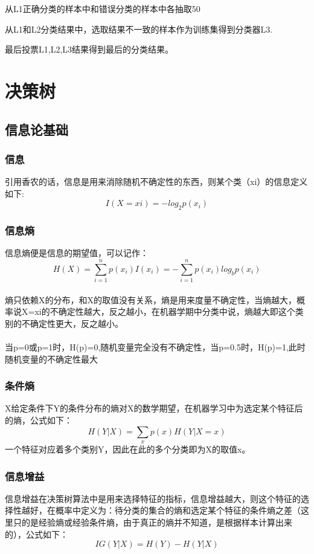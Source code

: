 \documentclass[18pt,a4paper,oneside,UTF8]{ctexart}
\begin{document}
从L1正确分类的样本中和错误分类的样本中各抽取50%

从L1和L2分类结果中，选取结果不一致的样本作为训练集得到分类器L3.

最后投票L1,L2,L3结果得到最后的分类结果。
\section{决策树}
\subsection{信息论基础}
\subsubsection{信息}
引用香农的话，信息是用来消除随机不确定性的东西，则某个类（xi）的信息定义如下:\newline
\[
    I(X=xi)=-log_2p(x_i)  
\]
\subsubsection{信息熵}
信息熵便是信息的期望值，可以记作：\newline
\[
    H(X)=\sum_{i=1}^np(x_i)I(x_i)=-\sum_{i=1}^np(x_i)log_bp(x_i)
\]
\paragraph{}
熵只依赖X的分布，和X的取值没有关系，熵是用来度量不确定性，当熵越大，概率说X=xi的不确定性越大，反之越小，在机器学期中分类中说，熵越大即这个类别的不确定性更大，反之越小。
\paragraph{}
当p=0或p=1时，H(p)=0,随机变量完全没有不确定性，当p=0.5时，H(p)=1,此时随机变量的不确定性最大
\subsubsection{条件熵}
X给定条件下Y的条件分布的熵对X的数学期望，在机器学习中为选定某个特征后的熵，公式如下：\newline
\[
    H(Y|X)=\sum_xp(x)H(Y|X=x)
\]
一个特征对应着多个类别Y，因此在此的多个分类即为X的取值x。
\subsubsection{信息增益}
信息增益在决策树算法中是用来选择特征的指标，信息增益越大，则这个特征的选择性越好，在概率中定义为：待分类的集合的熵和选定某个特征的条件熵之差（这里只的是经验熵或经验条件熵，由于真正的熵并不知道，是根据样本计算出来的），公式如下：\newline
\[
    IG(Y|X)=H(Y)-H(Y|X)
\]
\end{document}
